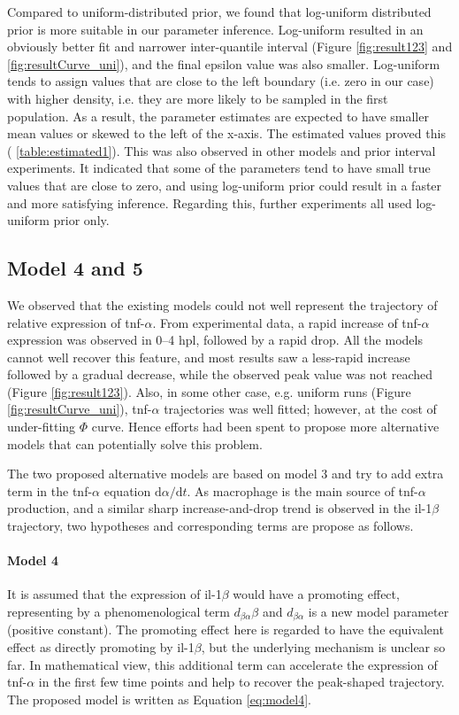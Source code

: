 Compared to uniform-distributed prior, we found that log-uniform distributed prior is more suitable in our parameter inference. Log-uniform resulted in an obviously better fit and narrower inter-quantile interval (Figure \ref{fig:result123} and \ref{fig:resultCurve_uni}), and the final epsilon value was also smaller. Log-uniform tends to assign values that are close to the left boundary (i.e. zero in our case) with higher density, i.e. they are more likely to be sampled in the first population. As a result, the parameter estimates are expected to have smaller mean values or skewed to the left of the x-axis. The estimated values proved this ( \ref{table:estimated1}). This was also observed in other models and prior interval experiments. It indicated that some of the parameters tend to have small true values that are close to zero, and using log-uniform prior could result in a faster and more satisfying inference. Regarding this, further experiments all used log-uniform prior only.


\subsection{Model 4 and 5}


We observed that the existing models could not well represent the trajectory of relative expression of tnf-$\alpha$. From experimental data, a rapid increase of tnf-$\alpha$ expression was observed in 0--4 hpl, followed by a rapid drop. All the models cannot well recover this feature, and most results saw a less-rapid increase followed by a gradual decrease, while the observed peak value was not reached (Figure \ref{fig:result123}). Also, in some other case, e.g. uniform runs (Figure \ref{fig:resultCurve_uni}), tnf-$\alpha$ trajectories was well fitted; however, at the cost of under-fitting $\Phi$ curve. Hence efforts had been spent to propose more alternative models that can potentially solve this problem.

The two proposed alternative models are based on model 3 and try to add extra term in the tnf-$\alpha$ equation $\mathrm{d} \alpha/\mathrm{d} t$. As macrophage is the main source of tnf-$\alpha$ production, and a similar sharp increase-and-drop trend is observed in the il-1$\beta$ trajectory, two hypotheses and corresponding terms are propose as follows.

\paragraph{Model 4} It is assumed that the expression of il-1$\beta$ would have a promoting effect, representing by a phenomenological term $d_{\beta\alpha}\beta$ and $d_{\beta\alpha}$ is a new model parameter (positive constant). The promoting effect here is regarded to have the equivalent effect as directly promoting by il-1$\beta$, but the underlying mechanism is unclear so far. In mathematical view, this additional term can accelerate the expression of tnf-$\alpha$ in the first few time points and help to recover the peak-shaped trajectory. The proposed model is written as Equation \ref{eq:model4}.

